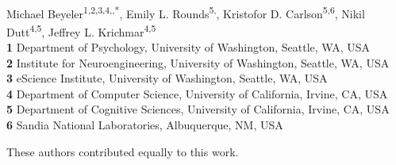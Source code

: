 \documentclass[10pt,letterpaper]{article}
\date{}
\begin{document}
\vspace*{0.2in}

\begin{flushleft}
{\Large
\textbf{} %
}
\newline
\\
Michael Beyeler\textsuperscript{1,2,3,4,\Yinyang,*},
Emily L. Rounds\textsuperscript{5,\Yinyang},
Kristofor D. Carlson\textsuperscript{5,6},
Nikil Dutt\textsuperscript{4,5},
Jeffrey L. Krichmar\textsuperscript{4,5}
\\
\bigskip
\textbf{1} Department of Psychology, University of Washington, Seattle, WA, USA \\
\textbf{2} Institute for Neuroengineering, University of Washington, Seattle, WA, USA \\
\textbf{3} eScience Institute, University of Washington, Seattle, WA, USA \\
\textbf{4} Department of Computer Science, University of California, Irvine, CA, USA \\
\textbf{5} Department of Cognitive Sciences, University of California, Irvine, CA, USA \\
\textbf{6} Sandia National Laboratories, Albuquerque, NM, USA \\
\bigskip

% 
%
\Yinyang These authors contributed equally to this work.




\end{flushleft}
\end{document}
